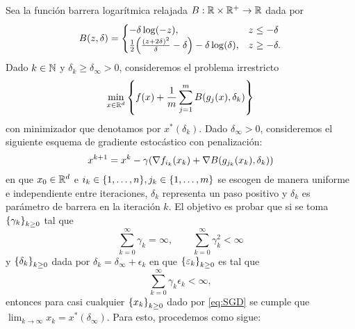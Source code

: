 \documentclass{article}
\begin{document}
Sea la función barrera logarítmica relajada \(B: \mathbb{R} \times \mathbb{R}^+ \to \mathbb{R}\) dada por
\[
B(z, \delta) = \begin{cases}
	- \delta \log(-z), & z \leq - \delta \\
	\frac{1}{2} \qty(\frac{(z + 2\delta)^2}{\delta} - \delta) - \delta \log(\delta), & z \geq - \delta.
\end{cases}
\]
Dado \(k \in \mathbb{N}\) y \(\delta_k \geq \delta_{\infty} > 0\), consideremos el problema irrestricto
\[\min_{x \in \mathbb{R}^d} \qty{f(x) + \frac{1}{m} \sum_{j=1}^m B(g_j(x), \delta_k)}\]
con minimizador que denotamos por \(x^*(\delta_k)\). Dado \(\delta_\infty > 0\), consideremos el siguiente esquema de gradiente estocástico con penalización:
\begin{equation} \label{eq:SGD}
	x^{k+1} = x^k - \gamma \qty(\nabla f_{i_k}(x_k) + \nabla B(g_{j_k}(x_k), \delta_k))
\end{equation}
en que \(x_0 \in \mathbb{R}^d\) e \(i_k \in \qty{1, \dots, n}, j_k \in \qty{1, \dots, m}\) se escogen de manera uniforme e independiente entre iteraciones, \(\delta_k\) representa un paso positivo y \(\delta_k\) es parámetro de barrera en la iteración \(k\). El objetivo es probar que si se toma \(\qty{\gamma_k}_{k \geq 0}\) tal que
\[\sum_{k = 0}^\infty \gamma_k = \infty, \qquad \sum_{k=0}^\infty \gamma_k^2 < \infty\]
y \(\qty{\delta_k}_{k \geq 0}\) dada por \(\delta_k = \delta_\infty + \epsilon_k\) en que \(\qty{\varepsilon_k}_{k \geq 0}\) es tal que
\[\sum_{k=0}^\infty \gamma_k \epsilon_k < \infty,\]
entonces para casi cualquier \(\qty{x_k}_{k \geq 0}\) dado por \eqref{eq:SGD} se cumple que \(\lim_{k \to \infty} x_k = x^*(\delta_\infty)\). Para esto, procedemos como sigue:
\end{document}
